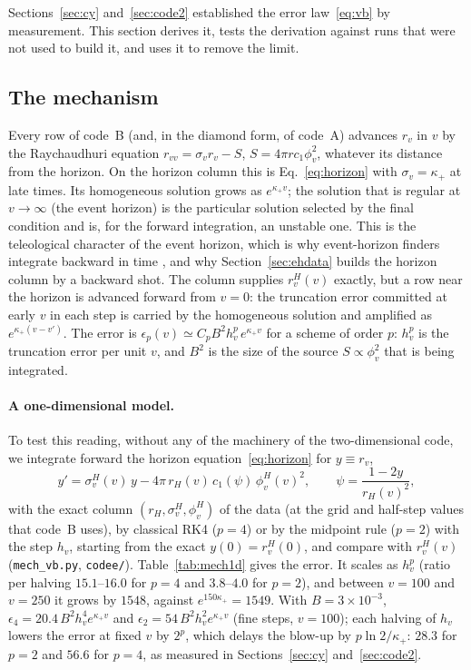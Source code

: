 \documentclass[11pt]{article}
\begin{document}
Sections~\ref{sec:cy} and~\ref{sec:code2} established the error law~\eqref{eq:vb} by measurement. This section derives it, tests the derivation against runs that were not used to build it, and uses it to remove the limit.

\subsection{The mechanism}

Every row of code~B (and, in the diamond form, of code~A) advances $r_v$ in $v$ by the Raychaudhuri equation $r_{vv}=\sigma_vr_v-S$, $S=4\pi rc_1\phi_v^{2}$, whatever its distance from the horizon. On the horizon column this is Eq.~\eqref{eq:horizon} with $\sigma_v=\kappa_+$ at late times. Its homogeneous solution grows as $e^{\kappa_+v}$; the solution that is regular at $v\to\infty$ (the event horizon) is the particular solution selected by the final condition and is, for the forward integration, an unstable one. This is the teleological character of the event horizon, which is why event-horizon finders integrate backward in time \citep{Libson1996,Diener2003}, and why Section~\ref{sec:ehdata} builds the horizon column by a backward shot. The column supplies $r_v^{H}(v)$ exactly, but a row near the horizon is advanced forward from $v=0$: the truncation error committed at early $v$ in each step is carried by the homogeneous solution and amplified as $e^{\kappa_+(v-v')}$. The error is $\epsilon_p(v)\simeq C_pB^{2}h_v^{p}\,e^{\kappa_+v}$ for a scheme of order $p$: $h_v^{p}$ is the truncation error per unit $v$, and $B^{2}$ is the size of the source $S\propto\phi_v^{2}$ that is being integrated.

\paragraph{A one-dimensional model.} To test this reading, without any of the machinery of the two-dimensional code, we integrate forward the horizon equation~\eqref{eq:horizon} for $y\equiv r_v$,
\begin{equation}
y'=\sigma_v^{H}(v)\,y-4\pi\,r_H(v)\,c_1(\psi)\,\phi_v^{H}(v)^{2},\qquad \psi=\frac{1-2y}{r_H(v)^{2}},
\label{eq:model1d}
\end{equation}
with the exact column $(r_H,\sigma_v^{H},\phi_v^{H})$ of the data (at the grid and half-step values that code~B uses), by classical RK4 ($p=4$) or by the midpoint rule ($p=2$) with the step $h_v$, starting from the exact $y(0)=r_v^{H}(0)$, and compare with $r_v^{H}(v)$ (\texttt{mech\_vb.py}, \texttt{codee/}). Table~\ref{tab:mech1d} gives the error. It scales as $h_v^{p}$ (ratio per halving $15.1$--$16.0$ for $p=4$ and $3.8$--$4.0$ for $p=2$), and between $v=100$ and $v=250$ it grows by $1548$, against $e^{150\kappa_+}=1549$. With $B=3\times10^{-3}$, $\epsilon_4=20.4\,B^{2}h_v^{4}e^{\kappa_+v}$ and $\epsilon_2=54\,B^{2}h_v^{2}e^{\kappa_+v}$ (fine steps, $v=100$); each halving of $h_v$ lowers the error at fixed $v$ by $2^{p}$, which delays the blow-up by $p\ln2/\kappa_+$: $28.3$ for $p=2$ and $56.6$ for $p=4$, as measured in Sections~\ref{sec:cy} and~\ref{sec:code2}.
\end{document}
